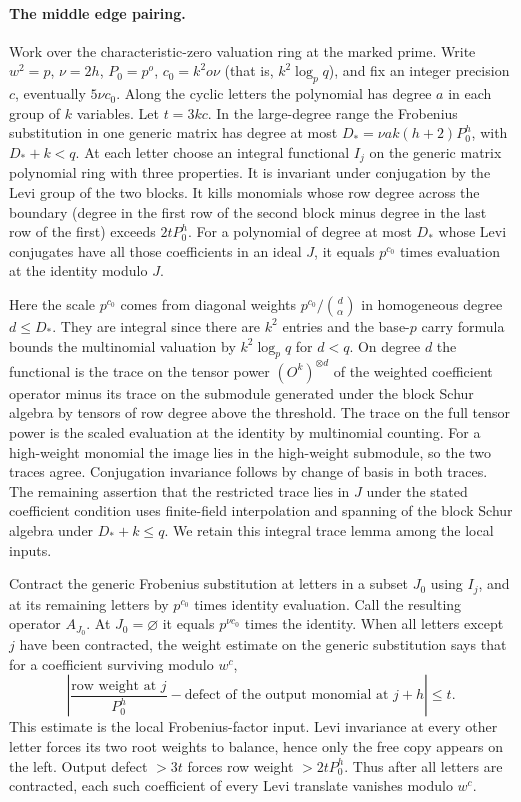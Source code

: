 \paragraph{The middle edge pairing.}\label{A:edgeaverage}
Work over the characteristic-zero valuation ring at the marked prime. Write $w^2=p$, $\nu=2h$, $P_0=p^o$, $c_0=k^2o\nu$ (that is, $k^2\log_p q$), and fix an integer precision $c$, eventually $5\nu c_0$. Along the cyclic letters the polynomial has degree $a$ in each group of $k$ variables. Let $t=3kc$. In the large-degree range the Frobenius substitution in one generic matrix has degree at most $D_*=\nu ak(h+2)P_0^h$, with $D_*+k<q$. At each letter choose an integral functional $I_j$ on the generic matrix polynomial ring with three properties. It is invariant under conjugation by the Levi group of the two blocks. It kills monomials whose row degree across the boundary (degree in the first row of the second block minus degree in the last row of the first) exceeds $2tP_0^h$. For a polynomial of degree at most $D_*$ whose Levi conjugates have all those coefficients in an ideal $J$, it equals $p^{c_0}$ times evaluation at the identity modulo $J$.

Here the scale $p^{c_0}$ comes from diagonal weights $p^{c_0}/\binom{d}{\alpha}$ in homogeneous degree $d\le D_*$. They are integral since there are $k^2$ entries and the base-$p$ carry formula bounds the multinomial valuation by $k^2\log_p q$ for $d<q$. On degree $d$ the functional is the trace on the tensor power $(O^k)^{\otimes d}$ of the weighted coefficient operator minus its trace on the submodule generated under the block Schur algebra by tensors of row degree above the threshold. The trace on the full tensor power is the scaled evaluation at the identity by multinomial counting. For a high-weight monomial the image lies in the high-weight submodule, so the two traces agree. Conjugation invariance follows by change of basis in both traces. The remaining assertion that the restricted trace lies in $J$ under the stated coefficient condition uses finite-field interpolation and spanning of the block Schur algebra under $D_*+k\le q$. We retain this integral trace lemma among the local inputs.

Contract the generic Frobenius substitution at letters in a subset $J_0$ using $I_j$, and at its remaining letters by $p^{c_0}$ times identity evaluation. Call the resulting operator $A_{J_0}$. At $J_0=\varnothing$ it equals $p^{\nu c_0}$ times the identity. When all letters except $j$ have been contracted, the weight estimate on the generic substitution says that for a coefficient surviving modulo $w^c$,
\[
 \left|\frac{\text{row weight at }j}{P_0^h}-
    \text{defect of the output monomial at }j+h\right|\le t.
\]
This estimate is the local Frobenius-factor input. Levi invariance at every other letter forces its two root weights to balance, hence only the free copy appears on the left. Output defect $>3t$ forces row weight $>2tP_0^h$. Thus after all letters are contracted, each such coefficient of every Levi translate vanishes modulo $w^c$.

